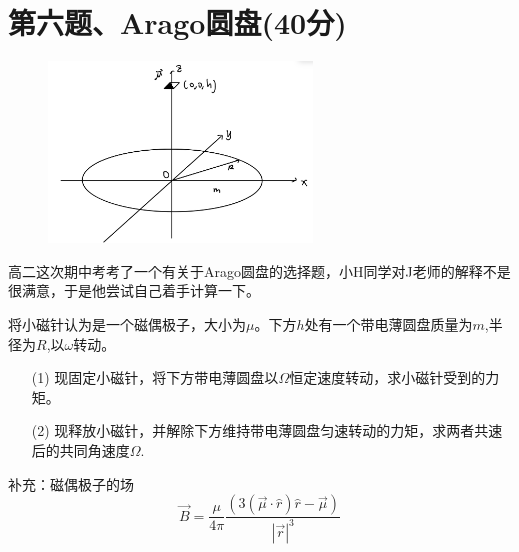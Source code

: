\documentclass{article}
\begin{document}
\section*{第六题、Arago圆盘(40分)}
\begin{figure}
	\vspace{-15pt}    %
	\includegraphics[width=7cm]{img/6.1.jpeg}\\
	\vspace{-15pt}    %
	\vspace{-15pt}    %
\end{figure}
高二这次期中考考了一个有关于Arago圆盘的选择题，小H同学对J老师的解释不是很满意，于是他尝试自己着手计算一下。\par
将小磁针认为是一个磁偶极子，大小为$\mu$。下方$h$处有一个带电薄圆盘质量为$m$,半径为$R$,以$\omega$转动。
\begin{itemize}
    \item[(1)]现固定小磁针，将下方带电薄圆盘以$\Omega$恒定速度转动，求小磁针受到的力矩。
    \item[(2)]现释放小磁针，并解除下方维持带电薄圆盘匀速转动的力矩，求两者共速后的共同角速度$\Omega$.
\end{itemize}
补充：磁偶极子的场
\[
\vec{B}=\dfrac{\mu}{4\pi}\dfrac{(3(\vec{\mu}\cdot\hat{r})\hat{r}-\vec{\mu})}{|\vec{r}|^3}
\]
\end{document}
